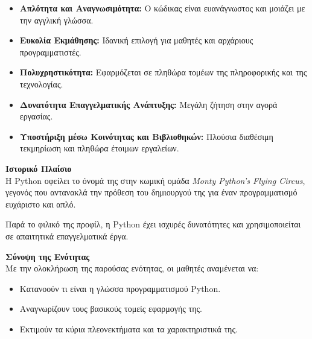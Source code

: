 \documentclass[11pt]{report}
\begin{document}
\begin{itemize}
    \item \textbf{Απλότητα και Αναγνωσιμότητα:} Ο κώδικας είναι ευανάγνωστος και μοιάζει με την αγγλική γλώσσα.
    \item \textbf{Ευκολία Εκμάθησης:} Ιδανική επιλογή για μαθητές και αρχάριους προγραμματιστές.
    \item \textbf{Πολυχρηστικότητα:} Εφαρμόζεται σε πληθώρα τομέων της πληροφορικής και της τεχνολογίας.
    \item \textbf{Δυνατότητα Επαγγελματικής Ανάπτυξης:} Μεγάλη ζήτηση στην αγορά εργασίας.
    \item \textbf{Υποστήριξη μέσω Κοινότητας και Βιβλιοθηκών:} Πλούσια διαθέσιμη τεκμηρίωση και πληθώρα έτοιμων εργαλείων.
\end{itemize}

\vspace{1em}
\textbf{Ιστορικό Πλαίσιο} \\[0.5em]

Η Python οφείλει το όνομά της στην κωμική ομάδα \textit{Monty Python’s Flying Circus}, γεγονός που αντανακλά την πρόθεση του δημιουργού της για έναν προγραμματισμό ευχάριστο και απλό.

Παρά το φιλικό της προφίλ, η Python έχει ισχυρές δυνατότητες και χρησιμοποιείται σε απαιτητικά επαγγελματικά έργα.

\vspace{1em}
\textbf{Σύνοψη της Ενότητας} \\[0.5em]
Με την ολοκλήρωση της παρούσας ενότητας, οι μαθητές αναμένεται να:

\begin{itemize}
    \item Κατανοούν τι είναι η γλώσσα προγραμματισμού Python.
    \item Αναγνωρίζουν τους βασικούς τομείς εφαρμογής της.
    \item Εκτιμούν τα κύρια πλεονεκτήματα και τα χαρακτηριστικά της.
\end{itemize}
\end{document}
